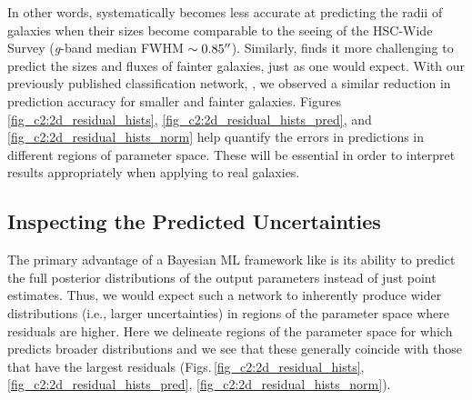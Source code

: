 In other words, \gampen{} systematically becomes less accurate at predicting the radii of galaxies when their sizes become comparable to the seeing of the HSC-Wide Survey (\textit{g}-band median FWHM $\sim0.85\mbox{$^{\prime\prime}$}$). Similarly, \gampen{} finds it more challenging to predict the sizes and fluxes of fainter galaxies, just as one would expect.
With our previously published classification network, \gamornet{} \citep{Ghosh2020GalaxyGalaxies}, we observed a similar reduction in prediction accuracy for smaller and fainter galaxies. Figures \ref{fig_c2:2d_residual_hists}, \ref{fig_c2:2d_residual_hists_pred}, and \ref{fig_c2:2d_residual_hists_norm} help quantify the errors in \gampen{} predictions in different regions of parameter space. These will be essential in order to interpret results appropriately when applying \gampen{} to real galaxies. 

\vspace{0.8cm}

\subsection{Inspecting the Predicted Uncertainties} \label{subsec_c2:uncertainties}
The primary advantage of a Bayesian ML framework like \gampen{} is its ability to predict the full posterior distributions of the output parameters instead of just point estimates. Thus, we would expect such a network to inherently produce wider distributions (i.e., larger uncertainties) in regions of the parameter space where residuals are higher. Here we delineate regions of the parameter space for which \gampen{} predicts broader distributions and we see that these generally coincide with those that have the largest residuals (Figs.\,\ref{fig_c2:2d_residual_hists}, \ref{fig_c2:2d_residual_hists_pred}, \ref{fig_c2:2d_residual_hists_norm}).  

